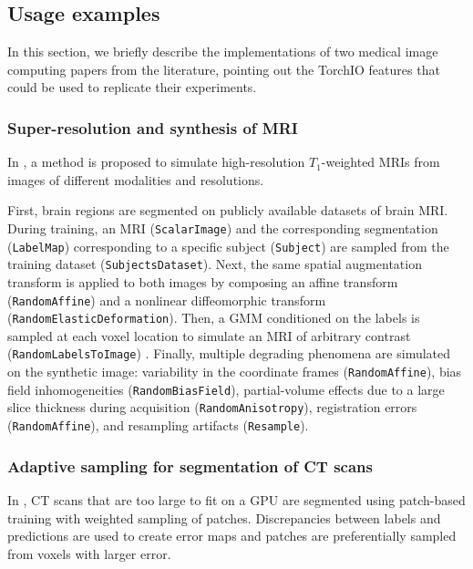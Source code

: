 \subsection{Usage examples}

\textcolor{rev2}{%
In this section, we briefly describe the implementations of two medical image
computing papers from the literature, pointing out the TorchIO features that
could be used to replicate their experiments.
}

\subsubsection{Super-resolution and synthesis of MRI}

\textcolor{rev2}{%
In \cite{iglesias_joint_2020}, a method is proposed to simulate high-resolution
$T_1$-weighted \acp{MRI} from images of different modalities and resolutions.
}

\textcolor{rev2}{%
First, brain regions are segmented on publicly available datasets of brain
\ac{MRI}.
%
During training, an \ac{MRI} (\texttt{ScalarImage})
and the corresponding segmentation (\texttt{LabelMap})
corresponding to a specific subject (\texttt{Subject})
are sampled from the training dataset (\texttt{SubjectsDataset}).
%
Next, the same spatial augmentation transform is applied to both images
by composing an affine transform (\texttt{RandomAffine}) and a nonlinear
diffeomorphic transform (\texttt{RandomElasticDeformation}).
%
Then, a \ac{GMM} conditioned on the labels is sampled at each voxel location
to simulate an \ac{MRI} of arbitrary
contrast (\texttt{RandomLabelsToImage}) \cite{billot_learning_2020}.
%
Finally, multiple degrading phenomena are simulated on the synthetic image:
variability in the coordinate frames (\texttt{RandomAffine}),
bias field inhomogeneities (\texttt{RandomBiasField}),
partial-volume effects due to a large slice thickness
during acquisition \cite{billot_partial_2020} (\texttt{RandomAnisotropy}),
registration errors (\texttt{RandomAffine}),
and resampling artifacts (\texttt{Resample}).
}

\subsubsection{Adaptive sampling for segmentation of CT scans}

\textcolor{rev2}{%
In \cite{berger_adaptive_2018}, \ac{CT} scans that are too large to fit
on a \ac{GPU} are segmented using
patch-based training with weighted sampling of patches.
%
Discrepancies between labels and predictions are used to create
error maps and patches are preferentially sampled
from voxels with larger error.
}

